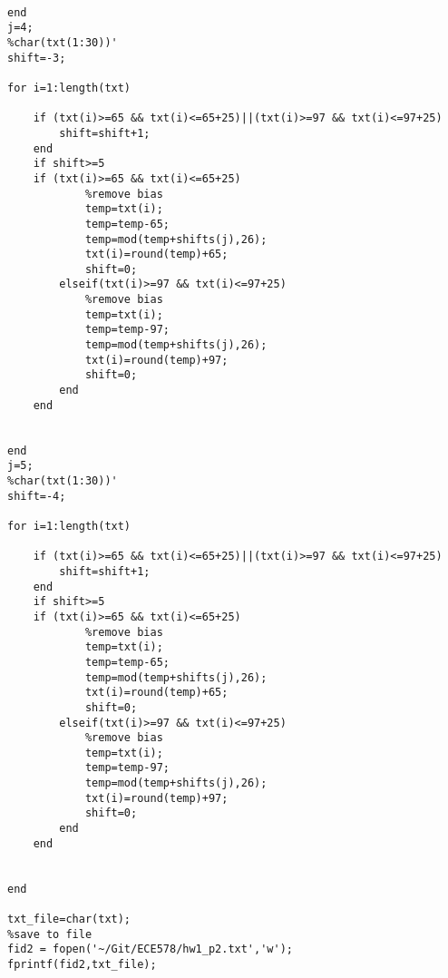 \documentclass[12pt]{article}
\begin{document}
\begin{lstlisting}
    
end
j=4;
%char(txt(1:30))'
shift=-3;

for i=1:length(txt)
    
    if (txt(i)>=65 && txt(i)<=65+25)||(txt(i)>=97 && txt(i)<=97+25)
        shift=shift+1;
    end
    if shift>=5 
    if (txt(i)>=65 && txt(i)<=65+25)
            %remove bias
            temp=txt(i);
            temp=temp-65;
            temp=mod(temp+shifts(j),26);
            txt(i)=round(temp)+65;
            shift=0;
        elseif(txt(i)>=97 && txt(i)<=97+25)
            %remove bias
            temp=txt(i);
            temp=temp-97;
            temp=mod(temp+shifts(j),26);
            txt(i)=round(temp)+97; 
            shift=0;
        end
    end
    
    
end
j=5;
%char(txt(1:30))'
shift=-4;

for i=1:length(txt)
    
    if (txt(i)>=65 && txt(i)<=65+25)||(txt(i)>=97 && txt(i)<=97+25)
        shift=shift+1;
    end
    if shift>=5 
    if (txt(i)>=65 && txt(i)<=65+25)
            %remove bias
            temp=txt(i);
            temp=temp-65;
            temp=mod(temp+shifts(j),26);
            txt(i)=round(temp)+65;
            shift=0;
        elseif(txt(i)>=97 && txt(i)<=97+25)
            %remove bias
            temp=txt(i);
            temp=temp-97;
            temp=mod(temp+shifts(j),26);
            txt(i)=round(temp)+97; 
            shift=0;
        end
    end
    
    
end

txt_file=char(txt);
%save to file
fid2 = fopen('~/Git/ECE578/hw1_p2.txt','w');
fprintf(fid2,txt_file);
\end{lstlisting}
\end{document}
